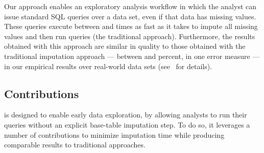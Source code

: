 

Our approach enables an exploratory analysis workflow in which the analyst can issue
standard SQL queries over a data set, even if that data has missing values.
These queries execute between \lowxalphazero{} and \highxalphazeroexacs{} times as fast as it takes to impute all missing values and then run queries (the traditional approach). Furthermore, the results obtained with this approach
are similar in quality to those obtained with the traditional imputation approach
--- between \lowsmapealphazero{} and \highsmapealphaoneexacs{}
percent, in one error measure --- in our empirical results over real-world data sets (see~
for details).


\subsection{Contributions}
\ProjectName{} is designed to enable early data exploration, by allowing analysts to run
their queries without an explicit base-table imputation step. To do so, it leverages a number of contributions
to minimize imputation time while producing comparable results to traditional approaches.

